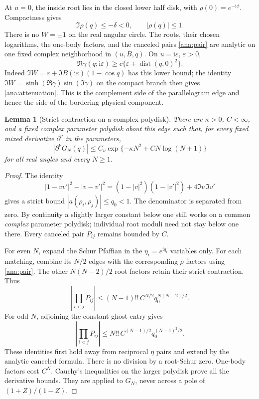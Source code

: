 \documentclass[11pt]{article}
\numberwithin{equation}{section}
\newtheorem{lemma}[theorem]{Lemma}
\theoremstyle{definition}
\newcommand{\ii}{\mathrm i}
\newcommand{\eps}{\varepsilon}
\begin{document}
At \(u=0\), the inside root lies in the closed lower half disk,
with \(\rho(0)=e^{-\ii\phi}\). Compactness gives
\[
 \Im\rho(q)\le-\delta<0,\qquad |\rho(q)|\le1.
\]
There is no \(W=\pm1\) on the real angular circle. The roots,
their chosen logarithms, the one-body factors, and the canceled
pairs \eqref{ana:pair} are analytic on one fixed complex
neighborhood in \((u,B,q)\). On \(u=\ii\eps\), \(\eps>0\),
\begin{equation}\label{ana:attenuation}
 \Re\gamma(q;\ii\eps)
   \ge c\{\eps+\operatorname{dist}(q,0)^2\}.
\end{equation}
Indeed
\(\Im W=\eps+\Im B(\ii\eps)(1-\cos q)\) has this lower bound;
the identity
\(\Im W=\sinh(\Re\gamma)\sin(\Im\gamma)\) on the compact branch
then gives \eqref{ana:attenuation}. This is the complement side
of the parallelogram edge and hence the side of the bordering
physical component.

\begin{lemma}[Strict contraction on a complex polydisk]
\label{ana:matching}
There are \(\kappa>0\), \(C<\infty\), and a fixed complex parameter
polydisk about this edge such that, for every fixed mixed derivative
\(\partial^\nu\) in the parameters,
\begin{equation}\label{ana:gaussian}
 |\partial^\nu G_N(q)|
 \le C_\nu\exp\{-\kappa N^2+C N\log(N+1)\}
\end{equation}
for all real angles and every \(N\ge1\).
\end{lemma}
\begin{proof}
The identity
\[
 |1-vv'|^2-|v-v'|^2
 =(1-|v|^2)(1-|v'|^2)+4\Im v\,\Im v'
\]
gives a strict bound \(|a(\rho_i,\rho_j)|\le q_0<1\).
The denominator is separated from zero. By continuity a slightly
larger constant below one still works on a common \emph{complex}
parameter polydisk; individual root moduli need not stay below one
there. Every canceled pair \(P_{ij}\) remains bounded by \(C\).

For even \(N\), expand the Schur Pfaffian in the
\(\eta_i=e^{\ii q_i}\) variables only. For each matching, combine
its \(N/2\) edges with the corresponding \(\rho\) factors using
\eqref{ana:pair}. The other \(N(N-2)/2\) root factors retain their
strict contraction. Thus
\[
 \left|\prod_{i<j}P_{ij}\right|
 \le(N-1)!!\,C^{N/2}q_0^{N(N-2)/2}.
\]
For odd \(N\), adjoining the constant ghost entry gives
\[
 \left|\prod_{i<j}P_{ij}\right|
 \le N!!\,C^{(N-1)/2}q_0^{(N-1)^2/2}.
\]
These identities first hold away from reciprocal \(\eta\) pairs and
extend by the analytic canceled formula. There is no division by
a root-Schur zero. One-body factors cost \(C^N\).
Cauchy's inequalities on the larger polydisk prove all the derivative
bounds. They are applied to \(G_N\), never across a pole of
\((1+Z)/(1-Z)\).
\end{proof}
\end{document}

